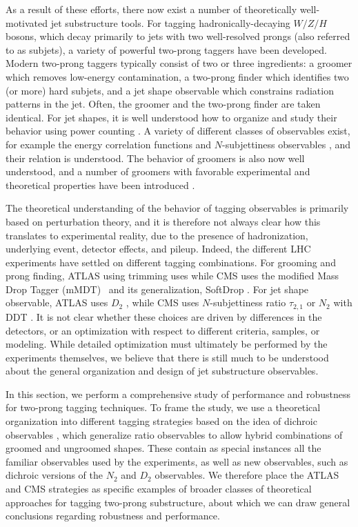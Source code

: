 As a result of these efforts, there now exist a number of theoretically well-motivated jet substructure tools.
%
For tagging hadronically-decaying $W/Z/H$ bosons, which decay primarily to jets with two well-resolved prongs (also referred to as subjets), a variety of powerful two-prong taggers have been developed.
%
Modern two-prong taggers typically consist of two or three
ingredients: a groomer which removes low-energy contamination, a
two-prong finder which identifies two (or more) hard subjets, and a jet
shape observable which constrains radiation patterns in the
jet.
%
Often, the groomer and the two-prong finder are taken identical.
%
For jet shapes, it is well understood how to organize and study their
behavior using power counting \cite{Larkoski:2014gra}.
%
A variety of
different classes of observables exist, for example the energy
correlation functions \cite{Larkoski:2013eya,Moult:2016cvt,Komiske:2017aww} and $N$-subjettiness
observables \cite{Thaler:2010tr,Thaler:2011gf}, and their relation is
understood.
%
The behavior of groomers is also now well understood, and
a number of groomers with favorable experimental and theoretical properties have been introduced
\cite{Dasgupta:2013ihk,Larkoski:2014wba}.

The
theoretical understanding of the behavior of tagging observables is primarily based on perturbation theory, and it is therefore
not always clear how this translates to experimental reality, due to
the presence of hadronization, underlying event, detector effects, and
pileup.
%
Indeed, the different LHC experiments have settled on different
tagging combinations.
%
For grooming and prong finding, ATLAS using trimming \cite{Krohn:2009th} uses while CMS uses the modified
  Mass Drop Tagger (mMDT)~\cite{Butterworth:2008iy,Dasgupta:2013ihk} and its generalization, SoftDrop \cite{Larkoski:2014wba}.
  For jet shape observable, ATLAS uses $D_2$ \cite{Larkoski:2014gra,Larkoski:2015kga}, while CMS uses $N$-subjettiness ratio $\tau_{2,1}$ \cite{Thaler:2010tr,Thaler:2011gf} or $N_2$ \cite{Moult:2016cvt} with DDT \cite{Dolen:2016kst}.
  It is not clear whether these choices are driven by differences in the detectors, or an optimization with respect to different criteria, samples, or modeling. While detailed optimization must ultimately be performed by the experiments themselves, we believe that there is still much to be understood about the general organization and design of jet substructure observables.

In this section, we perform a comprehensive study of performance and robustness for two-prong tagging techniques.
%
To frame the study, we use a theoretical organization into different tagging strategies based on the idea of dichroic observables \cite{Salam:2016yht}, which generalize ratio observables to allow hybrid combinations of groomed and ungroomed shapes.
 These contain as special instances all the familiar observables used by the experiments, as well as new observables, such as dichroic versions of the $N_2$ and $D_2$ observables.
 We therefore place the ATLAS and CMS strategies as specific examples of broader classes of theoretical approaches for tagging two-prong substructure, about which we can draw general conclusions regarding robustness and performance.


